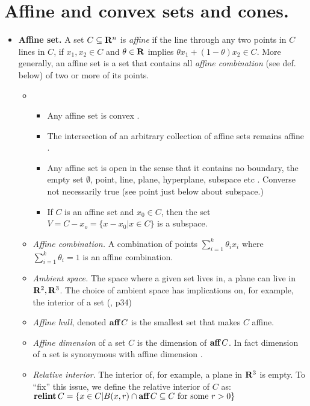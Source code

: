 \documentclass[a4paper, oneside]{book}
\begin{document}
\section{Affine and convex sets and cones.}
\begin{itemize}
	\item \textbf{Affine set.}  A set $C \subseteq	 \mathbf R^n$ is \textit{affine} if the line through any two points in $C$ lines in $C$, \ie if $x_1, x_2 \in C$ and $\theta \in \mathbf R$ implies $\theta x_1 + (1-\theta) x_2 \in C$.  More generally, an affine set is a set that contains all \textit{affine combination} (see def. below) of two or more of its points.
	\begin{itemize}
\item 	
		\begin{itemize}
		\item Any affine set is convex \cite{dattorro10}.
		\item The intersection of an arbitrary collection of affine sets remains affine \cite{dattorro10}.
		\item Any affine set is open in the sense that it contains no boundary, \eg the empty set $\emptyset$, point, line, plane, hyperplane, subspace etc \cite{dattorro10}. Converse not necessarily true (\eg see point just below about subspace.)
		\item If $C$ is an affine set and $x_0 \in C$, then the set $V=C-x_o = \{x-x_0 | x\in C\}$ is a subspace.
 		\end{itemize}
	\item \textit{Affine combination.} A combination of points $\sum_{i=1}^k \theta_i x_i$ where $\sum_{i=1}^k\theta_i = 1$ is an affine combination.
	\item \textit{Ambient space.} The space where a given set lives in, \eg a plane can live in $\mathbf R^2, \mathbf R^3$. The choice of ambient space has implications on, for example, the interior of a set (\cite{dattorro10}, p34)
	\item \textit{Affine hull}, denoted $\textbf{aff}\,C$ is the smallest set that makes $C$ affine.
	\item \textit{Affine dimension} of a set $C$ is the dimension of $\textbf{aff}\,C$. In fact dimension of a set is synonymous with affine dimension \cite{dattorro10}.
	\item \textit{Relative interior}. The interior of, for example, a plane in $\mathbf R^3$ is empty. To ``fix'' this issue, we define the relative interior of $C$ as: $\textbf{relint}\,C = \{x \in C | B(x,r) \cap \textbf{aff}\,C \subseteq C\text{ for some }r>0\}$

\end{itemize}
\end{itemize}
\end{document}

